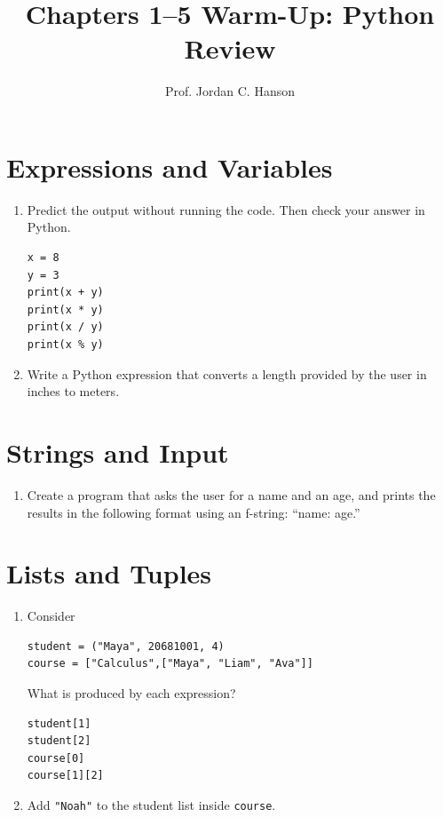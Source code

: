 \documentclass{article}
\begin{document}
\twocolumn

\title{Chapters 1--5 Warm-Up: Python Review}
\author{Prof. Jordan C. Hanson}
\date{}

\maketitle

\section{Expressions and Variables}

\begin{enumerate}
\item Predict the output without running the code.  Then check your
answer in Python.
\begin{verbatim}
x = 8
y = 3
print(x + y)
print(x * y)
print(x / y)
print(x % y)
\end{verbatim}
\item Write a Python expression that converts a length provided by the user in inches to meters.
\end{enumerate}

\section{Strings and Input}

\begin{enumerate}
\item Create a program that asks the user for a name and an age, and prints the results in the following format using an f-string: ``name: age.''
\end{enumerate}

\section{Lists and Tuples}

\begin{enumerate}
\item Consider
\begin{verbatim}
student = ("Maya", 20681001, 4)
course = ["Calculus",["Maya", "Liam", "Ava"]]
\end{verbatim}
What is produced by each expression?
\begin{verbatim}
student[1]
student[2]
course[0]
course[1][2]
\end{verbatim}
\item Add \texttt{"Noah"} to the student list inside \texttt{course}.
\end{enumerate}
\end{document}
